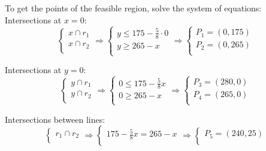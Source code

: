 \documentclass[unicode,11pt,a4paper,oneside,numbers=endperiod,openany]{scrartcl}
\begin{document}
To get the points of the feasible region, solve the system of equations:\\

Intersections at $x=0$:
\begin{equation*}
	\begin{cases}
		x \cap r_1 \\
		x \cap r_2 \\
	\end{cases}
	\Rightarrow
	\begin{cases}
		y \leq 175 - \frac{5}{8} \cdot 0 \\
		y \geq 265 - x                   \\
	\end{cases}
	\Rightarrow
	\begin{cases}
		P_1 = (0, 175) \\
		P_2 = (0, 265) \\
	\end{cases}
\end{equation*}

Intersections at $y=0$:
\begin{equation*}
	\begin{cases}
		y \cap r_1 \\
		y \cap r_2 \\
	\end{cases}
	\Rightarrow
	\begin{cases}
		0 \leq 175 - \frac{5}{8} x \\
		0 \geq 265 - x             \\
	\end{cases}
	\Rightarrow
	\begin{cases}
		P_3 = (280, 0) \\
		P_4 = (265, 0) \\
	\end{cases}
\end{equation*}

Intersections between lines:
\begin{equation*}
	\begin{cases}
		r_1 \cap r_2 \\
	\end{cases}
	\Rightarrow
	\begin{cases}
		175 - \frac{5}{8} x = 265 - x \\
	\end{cases}
	\Rightarrow
	\begin{cases}
		P_5 = (240, 25) \\
	\end{cases}
\end{equation*}
\end{document}
